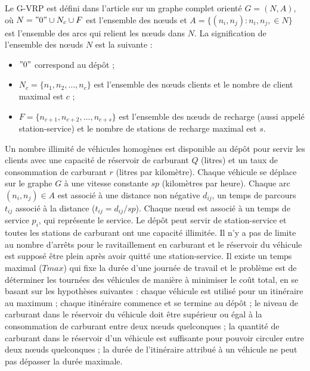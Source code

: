 Le G-VRP est défini dans l'article \cite{article_GVRP11} sur un graphe complet orienté $G = (N, A)$, où $N = "0" \cup N_c \cup F$ est l'ensemble des nœuds et $A = \{(n_i, n_j):n_i, n_j, \in N\}$ est l'ensemble des arcs qui relient les nœuds dans $N$. La signification de l'ensemble des nœuds $N$ est la suivante :
\begin{itemize}
	\item $"0"$ correspond au dépôt ;
	\item $N_c= \{n_1, n_2, \dots, n_c\}$ est l'ensemble des nœuds clients et le nombre de client maximal est $c$ ;
	\item $F = \{n_{c+1}, n_{c+2}, \dots, n_{c+s}\}$ est l'ensemble des nœuds de recharge (aussi appelé station-service) et le nombre de stations de recharge maximal est $s$.
\end{itemize}
Un nombre illimité de véhicules homogènes est disponible au dépôt pour servir les clients avec une capacité de réservoir de carburant $Q$ (litres) et un taux de consommation de carburant $r$ (litres par kilomètre). Chaque véhicule se déplace sur le graphe $G$ à une vitesse constante $sp$ (kilomètres par heure). Chaque arc $(n_i, n_j) \in A$ est associé à une distance non négative $d_{ij}$, un temps de parcours $t_{ij}$ associé à la distance ($t_{ij}= d_{ij}/sp$).
 Chaque nœud est associé à un temps de service $p_i$, qui représente le service.
Le dépôt peut servir de station-service et toutes les stations de carburant ont une capacité illimitée. Il n'y a pas de limite au nombre d'arrêts pour le ravitaillement en carburant et le réservoir du véhicule est supposé être plein après avoir quitté une station-service. Il existe un temps maximal ($Tmax$) qui fixe la durée d'une journée de travail et le problème est de déterminer les tournées des véhicules de manière à minimiser le coût total, en se basant sur les hypothèses suivantes : chaque véhicule est utilisé pour un itinéraire au maximum ; chaque itinéraire commence et se termine au dépôt ; le niveau de carburant dans le réservoir du véhicule doit être supérieur ou égal à la consommation de carburant entre deux nœuds quelconques ; la quantité de carburant dans le réservoir d'un véhicule est suffisante pour pouvoir circuler entre deux nœuds quelconques ; la durée de l'itinéraire attribué à un véhicule ne peut pas dépasser la durée maximale.

